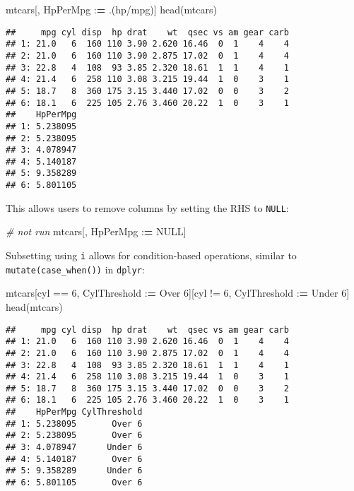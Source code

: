 \documentclass[
]{book}
\newenvironment{Shaded}{\begin{snugshade}}{\end{snugshade}}
\newcommand{\CommentTok}[1]{\textcolor[rgb]{0.56,0.35,0.01}{\textit{#1}}}
\newcommand{\ConstantTok}[1]{\textcolor[rgb]{0.00,0.00,0.00}{#1}}
\newcommand{\DecValTok}[1]{\textcolor[rgb]{0.00,0.00,0.81}{#1}}
\newcommand{\ErrorTok}[1]{\textcolor[rgb]{0.64,0.00,0.00}{\textbf{#1}}}
\newcommand{\FunctionTok}[1]{\textcolor[rgb]{0.00,0.00,0.00}{#1}}
\newcommand{\NormalTok}[1]{#1}
\newcommand{\SpecialCharTok}[1]{\textcolor[rgb]{0.00,0.00,0.00}{#1}}
\newcommand{\StringTok}[1]{\textcolor[rgb]{0.31,0.60,0.02}{#1}}
\begin{document}
\begin{Shaded}
\begin{Highlighting}[]
\NormalTok{mtcars[, HpPerMpg }\SpecialCharTok{:}\ErrorTok{=}\NormalTok{ .(hp}\SpecialCharTok{/}\NormalTok{mpg)]}
\FunctionTok{head}\NormalTok{(mtcars)}
\end{Highlighting}
\end{Shaded}

\begin{verbatim}
##     mpg cyl disp  hp drat    wt  qsec vs am gear carb
## 1: 21.0   6  160 110 3.90 2.620 16.46  0  1    4    4
## 2: 21.0   6  160 110 3.90 2.875 17.02  0  1    4    4
## 3: 22.8   4  108  93 3.85 2.320 18.61  1  1    4    1
## 4: 21.4   6  258 110 3.08 3.215 19.44  1  0    3    1
## 5: 18.7   8  360 175 3.15 3.440 17.02  0  0    3    2
## 6: 18.1   6  225 105 2.76 3.460 20.22  1  0    3    1
##    HpPerMpg
## 1: 5.238095
## 2: 5.238095
## 3: 4.078947
## 4: 5.140187
## 5: 9.358289
## 6: 5.801105
\end{verbatim}

This allows users to remove columns by setting the RHS to \texttt{NULL}:

\begin{Shaded}
\begin{Highlighting}[]
\CommentTok{\# not run}
\NormalTok{mtcars[, HpPerMpg }\SpecialCharTok{:}\ErrorTok{=} \ConstantTok{NULL}\NormalTok{]}
\end{Highlighting}
\end{Shaded}

Subsetting using \texttt{i} allows for condition-based operations, similar to \texttt{mutate(case\_when())} in \texttt{dplyr}:

\begin{Shaded}
\begin{Highlighting}[]
\NormalTok{mtcars[cyl }\SpecialCharTok{==} \DecValTok{6}\NormalTok{, CylThreshold }\SpecialCharTok{:}\ErrorTok{=} \StringTok{\textquotesingle{}Over 6\textquotesingle{}}\NormalTok{][cyl }\SpecialCharTok{!=} \DecValTok{6}\NormalTok{, CylThreshold }\SpecialCharTok{:}\ErrorTok{=} \StringTok{\textquotesingle{}Under 6\textquotesingle{}}\NormalTok{]}
\FunctionTok{head}\NormalTok{(mtcars)}
\end{Highlighting}
\end{Shaded}

\begin{verbatim}
##     mpg cyl disp  hp drat    wt  qsec vs am gear carb
## 1: 21.0   6  160 110 3.90 2.620 16.46  0  1    4    4
## 2: 21.0   6  160 110 3.90 2.875 17.02  0  1    4    4
## 3: 22.8   4  108  93 3.85 2.320 18.61  1  1    4    1
## 4: 21.4   6  258 110 3.08 3.215 19.44  1  0    3    1
## 5: 18.7   8  360 175 3.15 3.440 17.02  0  0    3    2
## 6: 18.1   6  225 105 2.76 3.460 20.22  1  0    3    1
##    HpPerMpg CylThreshold
## 1: 5.238095       Over 6
## 2: 5.238095       Over 6
## 3: 4.078947      Under 6
## 4: 5.140187       Over 6
## 5: 9.358289      Under 6
## 6: 5.801105       Over 6
\end{verbatim}
\end{document}
